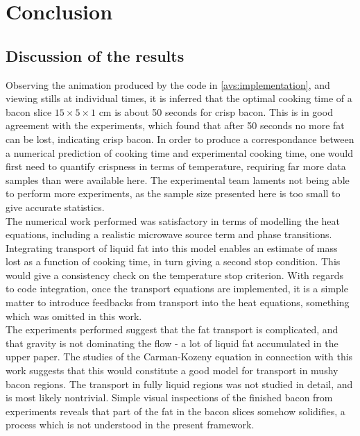 \chapter{Conclusion}
\section{Discussion of the results}
Observing the animation produced by the code in \cref{avs:implementation}, and
viewing stills at individual times, it is inferred that the optimal cooking time of
a bacon slice $15\times5\times1$ cm is about 50 seconds for crisp bacon. This is in good
agreement with the experiments, which found that after 50 seconds no more fat
can be lost, indicating crisp bacon. In order to produce a correspondance
between a numerical prediction of cooking time and experimental cooking time,
one would first need to quantify crispness in terms of temperature, requiring
far more data samples than were available here. The experimental team laments
not being able to perform more experiments, as the sample size presented here is
too small to give accurate statistics. \\

The numerical work performed was satisfactory in terms of modelling the heat
equations, including a realistic microwave source term and phase transitions.
Integrating transport of liquid fat into this model enables an estimate of
mass lost as a function of cooking time, in turn giving a second stop condition.
This would give a consistency check on the temperature stop criterion. With
regards to code integration, once the transport equations are implemented, it is
a simple matter to introduce feedbacks from transport into the heat equations,
something which was omitted in this work. \\

The experiments performed suggest that 
the fat transport is complicated, and that gravity is not dominating the flow -
a lot of liquid fat accumulated in the upper paper. The studies of the
Carman-Kozeny equation in connection with this work suggests that this would
constitute a good model for transport in mushy bacon regions. The transport in
fully liquid regions was not studied in detail, and is most likely nontrivial.
Simple visual inspections of the finished bacon from experiments reveals that
part of the fat in the bacon slices somehow solidifies, a process which is not
understood in the present framework.

